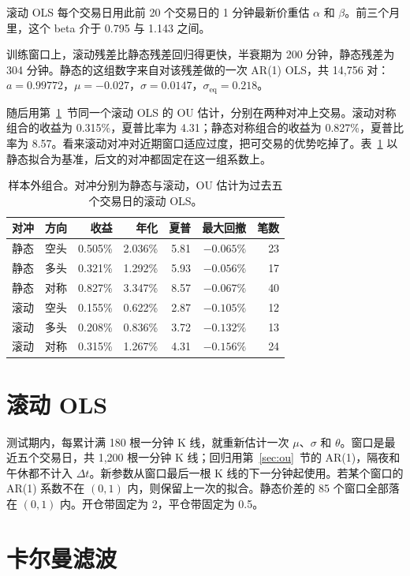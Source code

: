\documentclass[11pt,fontset=none,scheme=plain]{ctexart}
\begin{document}
滚动 OLS 每个交易日用此前 20 个交易日的 1 分钟最新价重估 $\alpha$ 和 $\beta$。前三个月里，这个 beta 介于 0.795 与 1.143 之间。

训练窗口上，滚动残差比静态残差回归得更快，半衰期为 200 分钟，静态残差为 304 分钟。静态的这组数字来自对该残差做的一次 AR(1) OLS，共 14{,}756 对：$a = 0.99772$，$\mu = -0.027$，$\sigma = 0.0147$，$\sigma_{\mathrm{eq}} = 0.218$。

随后用第~\ref{sec:trailing}~节同一个滚动 OLS 的 OU 估计，分别在两种对冲上交易。滚动对称组合的收益为 0.315\%，夏普比率为 4.31；静态对称组合的收益为 0.827\%，夏普比率为 8.57。看来滚动对冲对近期窗口适应过度，把可交易的优势吃掉了。表~\ref{tab:hedge} 以静态拟合为基准，后文的对冲都固定在这一组系数上。

\begin{table}[ht]
\centering
\caption{样本外组合。对冲分别为静态与滚动，OU 估计为过去五个交易日的滚动 OLS。}
\label{tab:hedge}
\begin{tabular}{llrrrrr}
\toprule
对冲 & 方向 & 收益 & 年化 & 夏普 & 最大回撤 & 笔数 \\
\midrule
静态 & 空头 & 0.505\% & 2.036\% & 5.81 & $-0.065\%$ & 23 \\
静态 & 多头 & 0.321\% & 1.292\% & 5.93 & $-0.056\%$ & 17 \\
静态 & 对称 & 0.827\% & 3.347\% & 8.57 & $-0.067\%$ & 40 \\
滚动 & 空头 & 0.155\% & 0.622\% & 2.87 & $-0.105\%$ & 12 \\
滚动 & 多头 & 0.208\% & 0.836\% & 3.72 & $-0.132\%$ & 13 \\
滚动 & 对称 & 0.315\% & 1.267\% & 4.31 & $-0.156\%$ & 24 \\
\bottomrule
\end{tabular}
\end{table}

\FloatBarrier
\section{滚动 OLS}
\label{sec:trailing}

测试期内，每累计满 180 根一分钟 K 线，就重新估计一次 $\mu$、$\sigma$ 和 $\theta$。窗口是最近五个交易日，共 1{,}200 根一分钟 K 线；回归用第~\ref{sec:ou}~节的 AR(1)，隔夜和午休都不计入 $\Delta t$。新参数从窗口最后一根 K 线的下一分钟起使用。若某个窗口的 AR(1) 系数不在 $(0,1)$ 内，则保留上一次的拟合。静态价差的 85 个窗口全部落在 $(0,1)$ 内。开仓带固定为 2，平仓带固定为 0.5。

\section{卡尔曼滤波}
\end{document}
